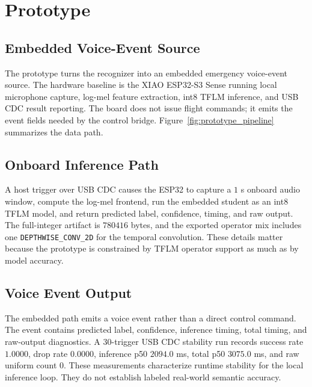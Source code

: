 \section{Prototype}
\label{sec:prototype}



\subsection{Embedded Voice-Event Source}

The prototype turns the recognizer into an embedded emergency voice-event source. The hardware baseline is the XIAO ESP32-S3 Sense running local microphone capture, log-mel feature extraction, int8 TFLM inference, and USB CDC result reporting. The board does not issue flight commands; it emits the event fields needed by the control bridge. Figure~\ref{fig:prototype_pipeline} summarizes the data path.

\subsection{Onboard Inference Path}

A host trigger over USB CDC causes the ESP32 to capture a $1$ s onboard audio window, compute the log-mel frontend, run the embedded student as an int8 TFLM model, and return predicted label, confidence, timing, and raw output. The full-integer artifact is $780416$ bytes, and the exported operator mix includes one \texttt{DEPTHWISE\_CONV\_2D} for the temporal convolution. These details matter because the prototype is constrained by TFLM operator support as much as by model accuracy.

\subsection{Voice Event Output}

The embedded path emits a voice event rather than a direct control command. The event contains predicted label, confidence, inference timing, total timing, and raw-output diagnostics. A $30$-trigger USB CDC stability run records success rate $1.0000$, drop rate $0.0000$, inference p50 $2094.0$ ms, total p50 $3075.0$ ms, and raw uniform count $0$. These measurements characterize runtime stability for the local inference loop. They do not establish labeled real-world semantic accuracy.

